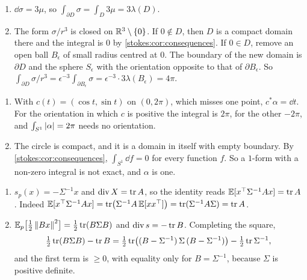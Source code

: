 \begin{enumerate}[nosep]
  \item $\dd\sigma = 3\mu$, so
        $\int_{\partial D}\sigma = \int_D3\mu = 3\lambda(D)$.
  \item The form $\sigma/r^3$ is closed on $\mathbb{R}^3\setminus\{0\}$. If
        $0\notin D$, then $D$ is a compact domain there and the
        integral is $0$ by \cref{stokes:cor:consequences}. If $0\in D$,
        remove an open ball $B_\epsilon$ of small radius centred at
        $0$. The boundary of the new domain is $\partial D$ and the
        sphere $S_\epsilon$ with the orientation opposite to that of
        $\partial B_\epsilon$. So
        $\int_{\partial D}\sigma/r^3
        = \epsilon^{-3}\int_{\partial B_\epsilon}\sigma
        = \epsilon^{-3}\cdot3\lambda(B_\epsilon) = 4\pi$.
\end{enumerate}

\begin{enumerate}[nosep]
  \item With $c(t) = (\cos t, \sin t)$ on $(0, 2\pi)$, which misses one
        point, $c^*\alpha = \dd t$. For the orientation in which $c$
        is positive the integral is $2\pi$, for the other $-2\pi$, and
        $\int_{S^1}\left|\alpha\right| = 2\pi$ needs no orientation.
  \item The circle is compact, and it is a domain in itself with empty
        boundary. By \cref{stokes:cor:consequences},
        $\int_{S^1}\dd f = 0$ for every function $f$. So a $1$-form
        with a non-zero integral is not exact, and $\alpha$ is one.
\end{enumerate}

\begin{enumerate}[nosep]
  \item $s_p(x) = -\Sigma^{-1}x$ and $\operatorname{div}X = \operatorname{tr} A$, so
        the identity reads $\mathbb{E}[x^\top\Sigma^{-1}Ax] = \operatorname{tr} A$. Indeed
        $\mathbb{E}[x^\top\Sigma^{-1}Ax] = \operatorname{tr}\bigl(\Sigma^{-1}A\,\mathbb{E}[xx^\top]
        \bigr) = \operatorname{tr}(\Sigma^{-1}A\Sigma) = \operatorname{tr} A$.
  \item $\mathbb{E}_p\bigl[\frac12\left\|Bx\right\|^2\bigr] = \frac12\operatorname{tr}(B\Sigma B)$
        and $\operatorname{div}s = -\operatorname{tr} B$. Completing the square,
        \[
          \tfrac12\operatorname{tr}(B\Sigma B) - \operatorname{tr} B
          = \tfrac12\operatorname{tr}\bigl((B - \Sigma^{-1})\,\Sigma\,
            (B - \Sigma^{-1})\bigr) - \tfrac12\operatorname{tr}\Sigma^{-1} ,
        \]
        and the first term is $\geq0$, with equality only for
        $B = \Sigma^{-1}$, because $\Sigma$ is positive definite.
\end{enumerate}

